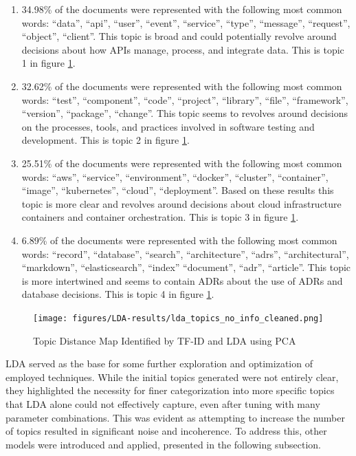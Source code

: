         \begin{enumerate}
            \item 34.98\% of the documents were represented with the following most common words: ``data'', ``api'', ``user'', ``event'', ``service'', ``type'', ``message'', ``request'', ``object'', ``client''. This topic is broad and could potentially revolve around decisions about how APIs manage, process, and integrate data. This is topic 1 in figure \ref{fig:LDA_results}.
            
            \item 32.62\% of the documents were represented with the following most common words: ``test'', ``component'', ``code'', ``project'', ``library'', ``file'', ``framework'', ``version'', ``package'', ``change''. This topic seems to revolves around decisions on the processes, tools, and practices involved in software testing and development. This is topic 2 in figure \ref{fig:LDA_results}.
    
            \item 25.51\% of the documents were represented with the following most common words: ``aws'', ``service'', ``environment'', ``docker'', ``cluster'', ``container'', ``image'', ``kubernetes'', ``cloud'', ``deployment''. Based on these results this topic is more clear and revolves around decisions about cloud infrastructure containers and container orchestration. This is topic 3 in figure \ref{fig:LDA_results}.
    
            \item 6.89\% of the documents were represented with the following most common words: ``record'', ``database'', ``search'', ``architecture'', ``adrs'', ``architectural'', ``markdown'', ``elasticsearch'', ``index'' ``document'', ``adr'', ``article''. This topic is more intertwined and seems to contain ADRs about the use of ADRs and database decisions. This is topic 4 in figure \ref{fig:LDA_results}.
        \end{enumerate}

        \begin{figure}[ht]
            \centering
            \texttt{[image: figures/LDA-results/lda\_topics\_no\_info\_cleaned.png]}
            \caption{Topic Distance Map Identified by TF-ID and LDA using PCA}
            \label{fig:LDA_results}
        \end{figure}

        LDA served as the base for some further exploration and optimization of employed techniques. While the initial topics generated were not entirely clear, they highlighted the necessity for finer categorization into more specific topics that LDA alone could not effectively capture, even after tuning with many parameter combinations. This was evident as attempting to increase the number of topics resulted in significant noise and incoherence. To address this, other models were introduced and applied, presented in the following subsection.


